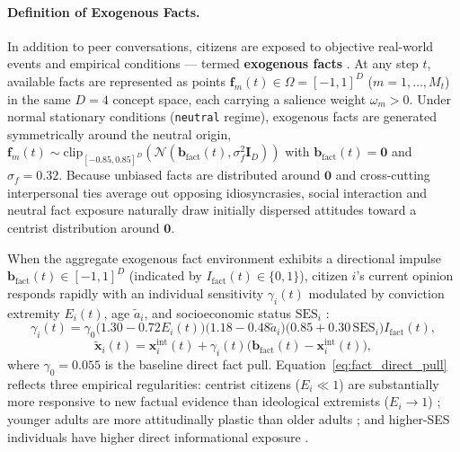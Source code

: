 \paragraph{Definition of Exogenous Facts.}
In addition to peer conversations, citizens are exposed to objective real-world events and empirical conditions — termed \textbf{exogenous facts} \citep{mullainathan2005market, gentzkow2006media}. At any step $t$, available facts are represented as points $\mathbf{f}_m(t) \in \Omega = [-1, 1]^D$ ($m = 1, \dots, M_t$) in the same $D = 4$ concept space, each carrying a salience weight $\omega_m > 0$. Under normal stationary conditions (\texttt{neutral} regime), exogenous facts are generated symmetrically around the neutral origin, $\mathbf{f}_m(t) \sim \mathrm{clip}_{[-0.85, 0.85]^D}(\mathcal{N}(\mathbf{b}_{\mathrm{fact}}(t), \sigma_f^2 \mathbf{I}_D))$ with $\mathbf{b}_{\mathrm{fact}}(t) = \mathbf{0}$ and $\sigma_f = 0.32$. Because unbiased facts are distributed around $\mathbf{0}$ and cross-cutting interpersonal ties average out opposing idiosyncrasies, social interaction and neutral fact exposure naturally draw initially dispersed attitudes toward a centrist distribution around $\mathbf{0}$.

When the aggregate exogenous fact environment exhibits a directional impulse $\mathbf{b}_{\mathrm{fact}}(t) \in [-1, 1]^D$ (indicated by $I_{\mathrm{fact}}(t) \in \{0, 1\}$), citizen $i$'s current opinion responds rapidly with an individual sensitivity $\gamma_i(t)$ modulated by conviction extremity $E_i(t)$, age $\tilde{a}_i$, and socioeconomic status $\mathrm{SES}_i$ \citep{zaller1992nature, howe2017attitude}:
\begin{equation}
    \gamma_i(t) = \gamma_0 \big(1.30 - 0.72 E_i(t)\big)\big(1.18 - 0.48\tilde{a}_i\big)\big(0.85 + 0.30\,\mathrm{SES}_i\big) I_{\mathrm{fact}}(t),
    \label{eq:fact_direct_pull}
\end{equation}
\begin{equation}
    \tilde{\mathbf{x}}_i(t) = \mathbf{x}_i^{\mathrm{int}}(t) + \gamma_i(t)\big(\mathbf{b}_{\mathrm{fact}}(t) - \mathbf{x}_i^{\mathrm{int}}(t)\big),
    \label{eq:opinion_fact_response}
\end{equation}
where $\gamma_0 = 0.055$ is the baseline direct fact pull. Equation~\eqref{eq:fact_direct_pull} reflects three empirical regularities: centrist citizens ($E_i \ll 1$) are substantially more responsive to new factual evidence than ideological extremists ($E_i \to 1$) \citep{howe2017attitude}; younger adults are more attitudinally plastic than older adults \citep{alwin1991aging}; and higher-SES individuals have higher direct informational exposure \citep{zaller1992nature}.

